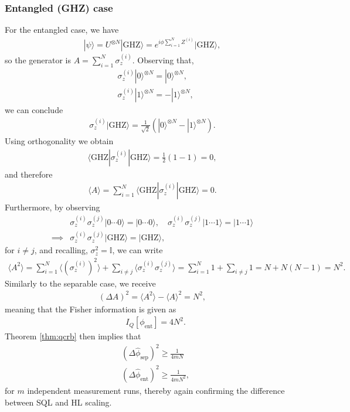 \subsubsection{Entangled (GHZ) case}
For the entangled case, we have
\begin{align}
    | \psi \rangle 
    = U^{\otimes N} | \text{GHZ} \rangle
    = e^{i\phi \sum_{i=1}^N Z^{(i)}} | \text{GHZ} \rangle,
\end{align}
so the generator is $A = \sum_{i=1}^N \sigma_z^{(i)}$. Observing that,
\begin{align}
    &\sigma_z^{(i)} | 0 \rangle^{\otimes N} = | 0 \rangle^{\otimes N}, \\
    &\sigma_z^{(i)} | 1 \rangle^{\otimes N} = -| 1 \rangle^{\otimes N},
\end{align}
we can conclude
\begin{align}
    \sigma_z^{(i)} | \text{GHZ} \rangle = \frac {1} {\sqrt 2} \left( | 0 \rangle^{\otimes N} -| 1 \rangle^{\otimes N} \right).
\end{align}
Using orthogonality we obtain
\begin{align}
    \langle \text{GHZ} | \sigma_z^{(i)} | \text{GHZ} \rangle
    = \frac 1 2 (1 - 1)=0,
\end{align}
and therefore
\begin{align}
    \langle A \rangle = \sum_{i=1}^N \langle \text{GHZ} | \sigma_z^{(i)} | \text{GHZ} \rangle
    = 0.
\end{align}
Furthermore, by observing
\begin{align}
    &\sigma_z^{(i)}\sigma_z^{(j)} |0\cdots 0\rangle = |0\cdots 0\rangle,
    \quad \sigma_z^{(i)}\sigma_z^{(j)} |1\cdots 1\rangle = |1\cdots 1\rangle \\
    \implies &\sigma_z^{(i)}\sigma_z^{(j)} | \text{GHZ} \rangle = | \text{GHZ} \rangle,
\end{align}
for $i \neq j$, and recalling, $\sigma_z^2 = \mathbb I$, we can write
\begin{align}
    \langle A^2 \rangle 
    = \sum_{i=1}^N \langle (\sigma_z^{(i)})^2 \rangle 
    + \sum_{i\neq j} \langle \sigma_z^{(i)} \sigma_z^{(j)} \rangle
    = \sum_{i=1}^N 1
    + \sum_{i\neq j} 1
    = N + N(N-1) = N^2.
\end{align}
Similarly to the separable case, we receive
\begin{align}
    (\Delta A)^2 = \langle A^2 \rangle - \langle A \rangle^2 = N^2,
\end{align}
meaning that the Fisher information is given as
\begin{align}
&I_Q[\phi_\text{ent}] = 4N^2.
\end{align}
Theorem \ref{thm:qcrb} then implies that
\begin{align}
    &(\Delta \hat \phi_\text{sep})^2 \geq \frac 1 {4mN}
    \label{eq:qcrb-sep} \\
    &(\Delta \hat \phi_\text{ent})^2 \geq \frac 1 {4mN^2},
    \label{eq:qcrb-ent}
\end{align}
for $m$ independent measurement runs, thereby again confirming the difference between SQL and HL scaling.


